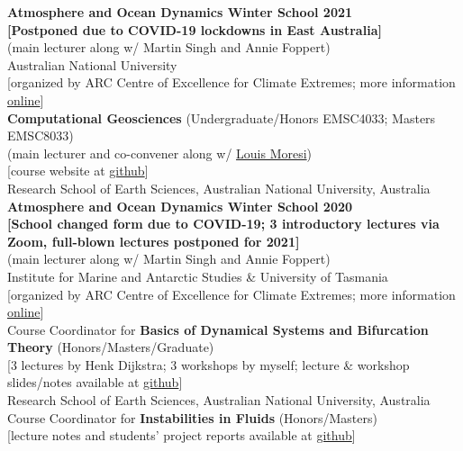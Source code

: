 \documentclass[10pt, letter]{article}
\newcommand{\years}[1]{\marginnote{\scriptsize #1}}
\begin{document}
\noindent\years{Jun.~2021}\textbf{Atmosphere and Ocean Dynamics Winter School 2021}\\
\textbf{[Postponed due to COVID-19 lockdowns in East Australia]}\\
(main lecturer along w/ Martin Singh and Annie Foppert)\\[0pt] 
Australian National University\\[0pt] 
[organized by ARC Centre of Excellence for Climate Extremes; more information \href{https://climateextremes.org.au/winter-school-2021-atmosphere-and-ocean-dynamics/}{online}]\\[.2cm]
\noindent\years{2021 --}\textbf{Computational Geosciences} (Undergraduate/Honors EMSC4033; Masters EMSC8033)\\
(main lecturer and co-convener along w/ \href{http://www.moresi.info}{\color{black}Louis Moresi})\\[0pt]
[course website at \href{https://github.com/ANU-RSES-Education/EMSC-4033}{github}]\\
Research School of Earth Sciences, Australian National University, Australia\\[.2cm]
\noindent\years{Jun.~2020}\textbf{Atmosphere and Ocean Dynamics Winter School 2020}\\
\textbf{[School changed form due to COVID-19; 3 introductory lectures via Zoom, full-blown lectures postponed for 2021]}\\
(main lecturer along w/ Martin Singh and Annie Foppert)\\[0pt] 
Institute for Marine and Antarctic Studies \& University of Tasmania\\[0pt] 
[organized by ARC Centre of Excellence for Climate Extremes; more information \href{https://climateextremes.org.au/clex-winter-school-2020-atmosphere-and-ocean-dynamics/}{online}]\\[.2cm]
\noindent\years{2020}Course Coordinator for \textbf{Basics of Dynamical Systems and Bifurcation Theory} (Honors/Masters/Graduate)\\[0pt] [3 lectures by Henk Dijkstra; 3 workshops by myself; lecture \& workshop slides/notes available at \href{https://github.com/ClimateFluidPhysics-ANU/DynamicalSystems-BifurcationTheory}{github}]\\
Research School of Earth Sciences, Australian National University, Australia\\[.2cm]
\noindent\years{2018}Course Coordinator for \textbf{Instabilities in Fluids} (Honors/Masters)\\[0pt] [lecture notes and students' project reports available at \href{https://github.com/navidcy/Instabilities-in-Fluids}{github}]\\
\end{document}

